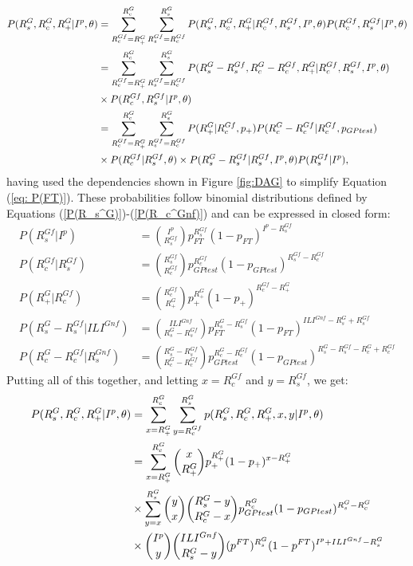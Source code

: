 \begin{align} \notag
	P(R_{s}^{G}, R_{c}^{G}, R_+^G | I^p, \theta) 
	&= \sum_{R_{c}^{Gf}=R_+^{G}}^{R_c^{G}} \sum_{R_{s}^{Gf}=R_{c}^{Gf}}^{R_{s}^{G}} P(R_s^G, R_{c}^{G}, R_{+}^{G} | R_{c}^{Gf}, R_{s}^{Gf}, I^p, \theta) P(R_{c}^{Gf}, R_{s}^{Gf}| I^p, \theta)\\ \notag
	&= \sum_{R_{c}^{Gf}=R_+^{G}}^{R_c^{G}} \sum_{R_{s}^{Gf}=R_{c}^{Gf}}^{R_{s}^{G}} P(R_s^G-R_{s}^{Gf}, R_{c}^{G}-R_{c}^{Gf}, R_{+}^{G} | R_{c}^{Gf}, R_{s}^{Gf}, I^p, \theta) \label{eq: P(FT)} \\
	&\times P(R_{c}^{Gf}, R_{s}^{Gf}| I^p, \theta)\\ \notag
	&= \sum_{R_{c}^{Gf}=R_+^{G}}^{R_c^{G}} \sum_{R_{s}^{Gf}=R_{c}^{Gf}}^{R_{s}^{G}} P(R_+^G | R_{c}^{Gf}, p_+) P(R_c^{G} -R_c^{Gf}| R_{c}^{Gf}, p_{GPtest}) \\ 
	&\times P(R_{c}^{Gf} | R_{s}^{Gf}, \theta)	\times P(R_{s}^{G} -R_{s}^{Gf} | R_{s}^{Gf}, I^p, \theta) P(R_{s}^{Gf} | I^p),
\end{align}
having used the dependencies shown in Figure \ref{fig:DAG} to simplify Equation (\ref{eq: P(FT)}).
These probabilities follow binomial distributions defined by Equations (\ref{P(R_s^G)})-(\ref{P(R_c^Gnf)}) and can be expressed in closed form:
\begin{align}
P(R_{s}^{Gf} | I^p) &= \binom{I^p}{R_{s}^{Gf}} p_{FT}^{R_{s}^{Gf}}(1-p_{FT})^{I^p-R_{s}^{Gf}} \\
P(R_{c}^{Gf} | R_{s}^{Gf}) &= \binom{R_{s}^{Gf}}{R_{c}^{Gf}} 
p_{GPtest}^{R_{c}^{Gf}}(1-p_{GPtest})^{R_{s}^{Gf}-R_{c}^{Gf}} \\
P(R_+^G | R_{c}^{Gf}) &= \binom{R_{c}^{Gf}}{R_{+}^G}p_+^{R_{+}^G}(1-p_+)^{R_{c}^{Gf}-R_{+}^G} \\
P(R_{s}^{G}-R_{s}^{Gf} | ILI^{Gnf}) &= \binom{ILI^{Gnf}}{R_{s}^{G}-R_{s}^{Gf}} p_{FT}^{R_{s}^{G}-R_{s}^{Gf}}(1-p_{FT})^{ILI^{Gnf}-R_{s}^{G}+R_{s}^{Gf}} \\
P(R_{c}^{G}-R_{c}^{Gf} | R_{s}^{Gnf}) &= \binom{R_{s}^{G}-R_{s}^{Gf}}{R_{c}^{G}-R_{c}^{Gf}} p_{GPtest}^{R_{c}^{G}-R_{c}^{Gf}}(1-p_{GPtest})^{R_{s}^{G}-R_{s}^{Gf}-R_{c}^{G}+R_{c}^{Gf}}
\end{align}
Putting all of this together, and letting $x=R_{c}^{Gf}$ and $y=R_{s}^{Gf}$, we get:
\begin{align} \notag
P(R_s^G, R_c^G, R_+^G | I^p, \theta)	&= \sum_{x=R_+^{G}}^{R_c^{G}} \sum_{y=R_{c}^{Gf}}^{R_{s}^{G}} p(R_s^G, R_c^G, R_+^G, x, y | I^p, \theta) \\ \notag
&= \sum_{x=R_{+}^{G}}^{R_{c}^{G}} \binom{x}{R_{+}^G} p_+^{R_{+}^G}(1-p_+)^{x-R_{+}^G} \\ \notag
& \times \sum_{y=x}^{R_{s}^G} \binom{y}{x} \binom{R_{s}^G-y}{R_{c}^G-x} p_{GPtest}^{R_{c}^G}(1-p_{GPtest})^{R_{s}^G-R_{c}^G} \\ \label{eq: P(FT_GP)}
& \times \binom{I^p}{y} \binom{ILI^{Gnf}}{R_{s}^G-y} (p^{FT})^{R_{s}^G}(1-p^{FT})^{I^p+ILI^{Gnf}-R_{s}^G}
\end{align}

